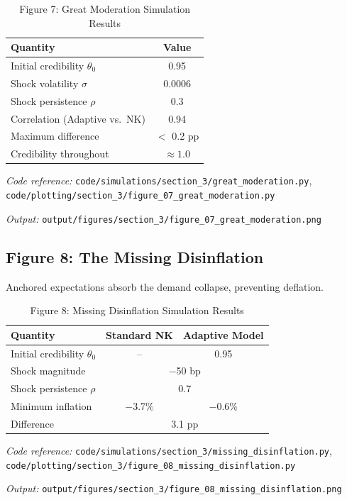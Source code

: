 \documentclass[11pt]{article}
\begin{document}
\begin{table}[htbp]
\centering
\caption{Figure 7: Great Moderation Simulation Results}
\label{tab:great_moderation}
\begin{threeparttable}
\begin{tabular}{lc}
\toprule
Quantity & Value \\
\midrule
Initial credibility $\theta_0$ & 0.95 \\
Shock volatility $\sigma$ & 0.0006 \\
Shock persistence $\rho$ & 0.3 \\
\midrule
Correlation (Adaptive vs.\ NK) & 0.94 \\
Maximum difference & $<$ 0.2 pp \\
Credibility throughout & $\approx 1.0$ \\
\bottomrule
\end{tabular}
\begin{tablenotes}
\small
\item \textit{Code reference:} \texttt{code/simulations/section\_3/great\_moderation.py}, \texttt{code/plotting/section\_3/figure\_07\_great\_moderation.py}
\item \textit{Output:} \texttt{output/figures/section\_3/figure\_07\_great\_moderation.png}
\end{tablenotes}
\end{threeparttable}
\end{table}

\subsection{Figure 8: The Missing Disinflation}

Anchored expectations absorb the demand collapse, preventing deflation.

\begin{table}[htbp]
\centering
\caption{Figure 8: Missing Disinflation Simulation Results}
\label{tab:missing_disinflation}
\begin{threeparttable}
\begin{tabular}{lcc}
\toprule
Quantity & Standard NK & Adaptive Model \\
\midrule
Initial credibility $\theta_0$ & -- & 0.95 \\
Shock magnitude & \multicolumn{2}{c}{$-$50 bp} \\
Shock persistence $\rho$ & \multicolumn{2}{c}{0.7} \\
\midrule
Minimum inflation & $-$3.7\% & $-$0.6\% \\
Difference & \multicolumn{2}{c}{3.1 pp} \\
\bottomrule
\end{tabular}
\begin{tablenotes}
\small
\item \textit{Code reference:} \texttt{code/simulations/section\_3/missing\_disinflation.py}, \texttt{code/plotting/section\_3/figure\_08\_missing\_disinflation.py}
\item \textit{Output:} \texttt{output/figures/section\_3/figure\_08\_missing\_disinflation.png}
\end{tablenotes}
\end{threeparttable}
\end{table}
\end{document}
